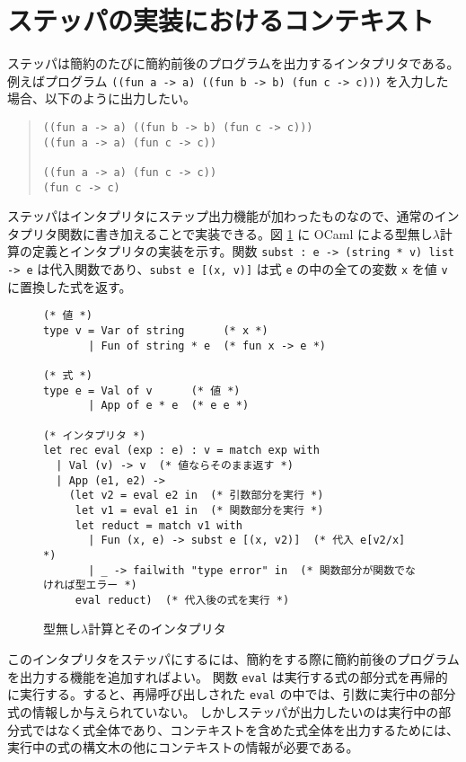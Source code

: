 \section{ステッパの実装におけるコンテキスト}
\label{section:context}

ステッパは簡約のたびに簡約前後のプログラムを出力するインタプリタである。例えばプログラム \texttt{((fun a -> a) ((fun b -> b) (fun c -> c)))} を入力した場合、以下のように出力したい。

\begin{quote}
\begin{verbatim}
((fun a -> a) ((fun b -> b) (fun c -> c)))
((fun a -> a) (fun c -> c))

((fun a -> a) (fun c -> c))
(fun c -> c)
\end{verbatim}
\end{quote}

ステッパはインタプリタにステップ出力機能が加わったものなので、通常のインタプリタ関数に書き加えることで実装できる。図 \ref{figure:lambda} に OCaml による型無し$\lambda$計算の定義とインタプリタの実装を示す。関数 \texttt{subst : e -> (string * v) list -> e} は代入関数であり、\texttt{subst e [(x, v)]} は式 \texttt{e} の中の全ての変数 \texttt{x} を値 \texttt{v} に置換した式を返す。

\begin{figure}
\begin{verbatim}
(* 値 *)
type v = Var of string      (* x *)
       | Fun of string * e  (* fun x -> e *)

(* 式 *)
type e = Val of v      (* 値 *)
       | App of e * e  (* e e *)

(* インタプリタ *)
let rec eval (exp : e) : v = match exp with
  | Val (v) -> v  (* 値ならそのまま返す *)
  | App (e1, e2) ->
    (let v2 = eval e2 in  (* 引数部分を実行 *)
     let v1 = eval e1 in  (* 関数部分を実行 *)
     let reduct = match v1 with
       | Fun (x, e) -> subst e [(x, v2)]  (* 代入 e[v2/x] *)
       | _ -> failwith "type error" in  (* 関数部分が関数でなければ型エラー *)
     eval reduct)  (* 代入後の式を実行 *)
\end{verbatim}
\caption{型無し$\lambda$計算とそのインタプリタ}
\label{figure:lambda}
\end{figure}

このインタプリタをステッパにするには、簡約をする際に簡約前後のプログラムを出力する機能を追加すればよい。
関数 \texttt{eval} は実行する式の部分式を再帰的に実行する。すると、再帰呼び出しされた \texttt{eval} の中では、引数に実行中の部分式の情報しか与えられていない。
しかしステッパが出力したいのは実行中の部分式ではなく式全体であり、コンテキストを含めた式全体を出力するためには、実行中の式の構文木の他にコンテキストの情報が必要である。


